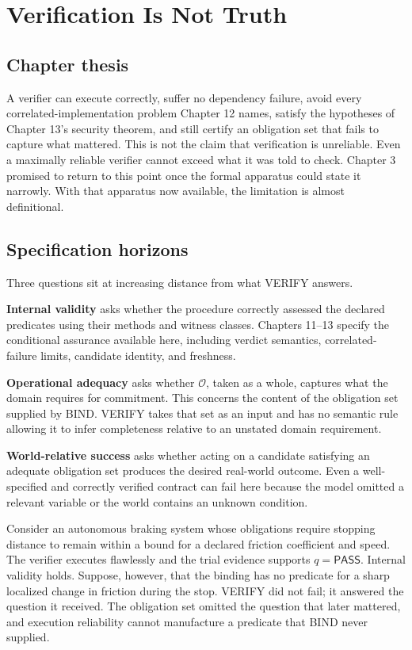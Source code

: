 \documentclass[11pt,openany]{book}
\newcommand{\Pass}{\mathsf{PASS}}
\begin{document}
\chapter{Verification Is Not Truth}
\section{Chapter thesis}

A verifier can execute correctly, suffer no dependency failure, avoid every
correlated-implementation problem Chapter 12 names, satisfy the hypotheses of
Chapter 13's security theorem, and still certify an obligation set that fails
to capture what mattered. This is not the claim that verification is
unreliable. Even a maximally reliable verifier cannot exceed what it was told
to check. Chapter 3 promised to return to this point once the formal apparatus
could state it narrowly. With that apparatus now available, the limitation is
almost definitional.

\section{Specification horizons}

Three questions sit at increasing distance from what VERIFY answers.

\textbf{Internal validity} asks whether the procedure correctly assessed the
declared predicates using their methods and witness classes. Chapters 11--13
specify the conditional assurance available here, including verdict semantics,
correlated-failure limits, candidate identity, and freshness.

\textbf{Operational adequacy} asks whether \(\mathcal O\), taken as a whole,
captures what the domain requires for commitment. This concerns the content of
the obligation set supplied by BIND. VERIFY takes that set as an input and has
no semantic rule allowing it to infer completeness relative to an unstated
domain requirement.

\textbf{World-relative success} asks whether acting on a candidate satisfying
an adequate obligation set produces the desired real-world outcome. Even a
well-specified and correctly verified contract can fail here because the model
omitted a relevant variable or the world contains an unknown condition.

Consider an autonomous braking system whose obligations require stopping
distance to remain within a bound for a declared friction coefficient and
speed. The verifier executes flawlessly and the trial evidence supports
\(q=\Pass\). Internal validity holds. Suppose, however, that the binding has no
predicate for a sharp localized change in friction during the stop. VERIFY did
not fail; it answered the question it received. The obligation set omitted the
question that later mattered, and execution reliability cannot manufacture a
predicate that BIND never supplied.
\end{document}
